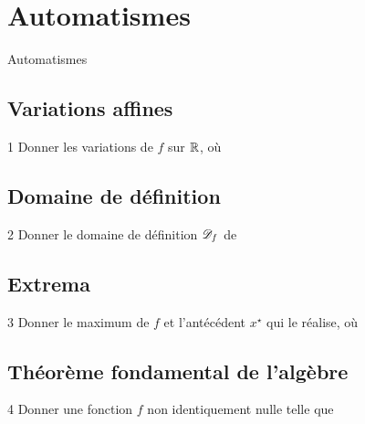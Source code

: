 
\AdvanceDate[1]



\section{Automatismes}

\begin{frame}

\centering \huge
Automatismes


\end{frame}

\subsection{Variations affines}

\begin{frame}{1\vspace{-32pt}}
	Donner les variations de $f$ sur $\mathbb{R}$, où
\end{frame}

\subsection{Domaine de définition}

\begin{frame}{2\vspace{-32pt}}
	Donner le domaine de définition $\mathcal{D}_f$ de
\end{frame}

\subsection{Extrema}

\begin{frame}{3\vspace{-32pt}}
	Donner le maximum de $f$ et l'antécédent $x^\star$ qui le réalise, où
\end{frame}

\subsection{Théorème fondamental de l'algèbre}

\begin{frame}{4\vspace{-32pt}}	
	Donner une fonction $f$ non identiquement nulle telle que
\end{frame}

